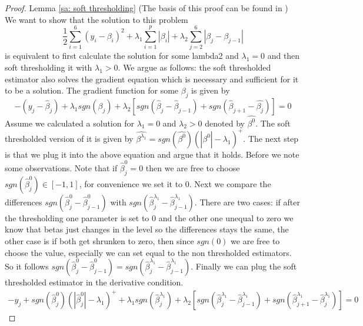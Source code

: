 \documentclass{article}
\theoremstyle{definition}
\begin{document}
\begin{proof} Lemma \ref{sa: soft thresholding} (The basis of this proof can be found in \citep{friedman2007pathwise})
	We want  to show that the solution to this problem 
	\begin{equation}
	\frac{1}{2}  \sum_{i=1}^{6}(y_{i}-\beta_i)^2+\lambda_1\sum_{i=1}^p|\beta_i| + \lambda_2 \sum_{j=2}^6|\beta_j- \beta_{j-1} |
	\end{equation} is equivalent to first calculate the solution for some lambda2  and $\lambda_1 =0$ and then soft thresholding it with $\lambda_1>0$. We argue as follows: the soft thresholded estimator also solves the gradient equation which is necessary and sufficient for it to be a solution. The gradient function for some $\beta_j$ is given by
	\begin{equation}
	-(y_j-\hat{\beta}_j)+\lambda_1 sgn(\beta_j)+\lambda_2 [sgn(\hat{\beta}_j-\hat{\beta}_{j-1})+sgn(\hat{\beta}_{j+1}-\hat{\beta_j})]=0
	\end{equation}
	Assume we calculated a solution for $\lambda_1=0$ and $\lambda_2 > 0$ denoted by $\hat{\beta^0}$. The soft thresholded version of it is given by $\hat{\beta^{\lambda_1}}=sgn(\hat{\beta^0})(|\hat{\beta^0}|-\lambda_1)^{\text{+}}$. The next step is that we plug it into the above equation and argue that it holds. Before we note some observations. Note that if $\hat{\beta}^0_j=0$ then we are free to choose $sgn(\hat{\beta}^0_j) \in [-1,1]$, for convenience we set it to 0. Next we compare the differences $sgn(\hat{\beta}_j^0-\hat{\beta}_{j-1}^0)$ with $sgn(\hat{\beta}_j^{\lambda_1}-\hat{\beta}_{j-1}^{\lambda_1})$. There are two cases: if after the thresholding one parameter is set to 0 and the other one unequal to zero we know that betas just changes in the level so the differences stays the same, the other case is if both get shrunken to zero, then since $sgn(0)$ we are free to choose the value, especially we can set equal to the non thresholded estimators. So it follows $sgn(\hat{\beta}_j^0-\hat{\beta}_{j-1}^0)=sgn(\hat{\beta}_j^{\lambda_1}-\hat{\beta}_{j-1}^{\lambda_1})$. Finally we can plug the soft thresholded estimator in the derivative condition.
	\begin{align}
	-y_j+sgn(\hat{\beta}^0_j)(|\hat{\beta}_j^0|-\lambda_1)^{\text{+}}+\lambda_1 sgn(\hat{\beta}_j^{\lambda_1})+\lambda_2 [sgn(\hat{\beta}^{\lambda_1}_j-\hat{\beta}^{\lambda_1}_{j-1})+sgn(\hat{\beta}^{\lambda_1}_{j+1}-\hat{\beta}^{\lambda_1}_j)]=0

\end{align}
\end{proof}
\end{document}
